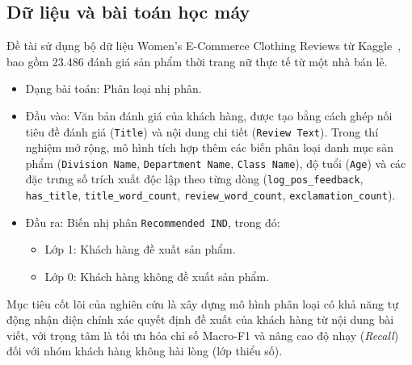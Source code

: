 \subsection{Dữ liệu và bài toán học máy}
Đề tài sử dụng bộ dữ liệu Women's E-Commerce Clothing Reviews từ Kaggle~\cite{dataset}, bao gồm 23.486 đánh giá sản phẩm thời trang nữ thực tế từ một nhà bán lẻ.
\begin{itemize}
    \item Dạng bài toán: Phân loại nhị phân.
    \item Đầu vào: Văn bản đánh giá của khách hàng, được tạo bằng cách ghép nối tiêu đề đánh giá (\texttt{Title}) và nội dung chi tiết (\texttt{Review Text}). Trong thí nghiệm mở rộng, mô hình tích hợp thêm các biến phân loại danh mục sản phẩm (\texttt{Division Name}, \texttt{Department Name}, \texttt{Class Name}), độ tuổi (\texttt{Age}) và các đặc trưng số trích xuất độc lập theo từng dòng (\texttt{log\_pos\_feedback}, \texttt{has\_title}, \texttt{title\_word\_count}, \texttt{review\_word\_count}, \texttt{exclamation\_count}).
    \item Đầu ra: Biến nhị phân \texttt{Recommended IND}, trong đó:
    \begin{itemize}
        \item Lớp 1: Khách hàng đề xuất sản phẩm.
        \item Lớp 0: Khách hàng không đề xuất sản phẩm.
    \end{itemize}
\end{itemize}

Mục tiêu cốt lõi của nghiên cứu là xây dựng mô hình phân loại có khả năng tự động nhận diện chính xác quyết định đề xuất của khách hàng từ nội dung bài viết, với trọng tâm là tối ưu hóa chỉ số Macro-F1 và nâng cao độ nhạy (\textit{Recall}) đối với nhóm khách hàng không hài lòng (lớp thiểu số).

